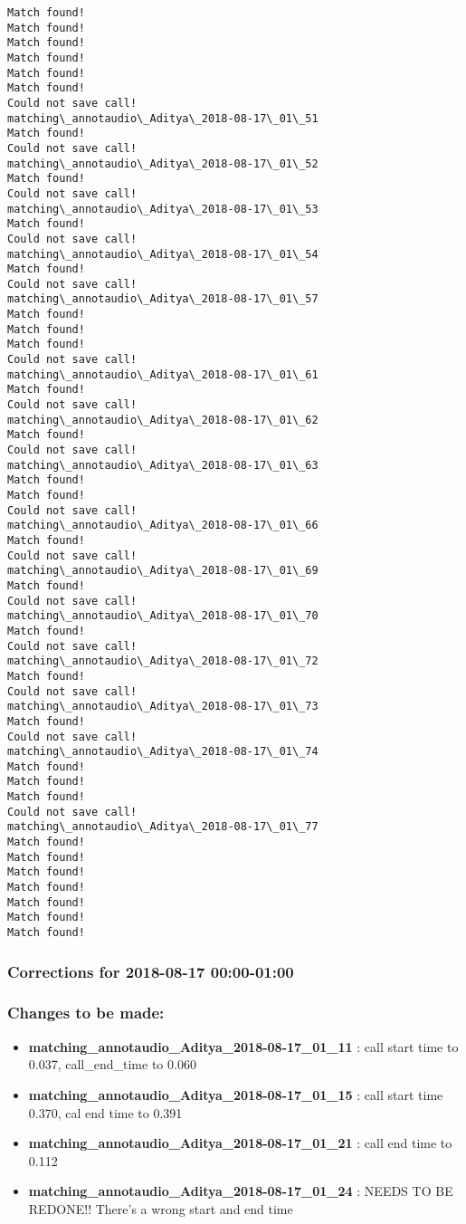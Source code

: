 \documentclass[11pt]{article}
\providecommand{\tightlist}{%
      \setlength{\itemsep}{0pt}\setlength{\parskip}{0pt}}
\begin{document}
\begin{Verbatim}[commandchars=\\\{\}]
Match found!
Match found!
Match found!
Match found!
Match found!
Match found!
Could not save call!
matching\_annotaudio\_Aditya\_2018-08-17\_01\_51
Match found!
Could not save call!
matching\_annotaudio\_Aditya\_2018-08-17\_01\_52
Match found!
Could not save call!
matching\_annotaudio\_Aditya\_2018-08-17\_01\_53
Match found!
Could not save call!
matching\_annotaudio\_Aditya\_2018-08-17\_01\_54
Match found!
Could not save call!
matching\_annotaudio\_Aditya\_2018-08-17\_01\_57
Match found!
Match found!
Match found!
Could not save call!
matching\_annotaudio\_Aditya\_2018-08-17\_01\_61
Match found!
Could not save call!
matching\_annotaudio\_Aditya\_2018-08-17\_01\_62
Match found!
Could not save call!
matching\_annotaudio\_Aditya\_2018-08-17\_01\_63
Match found!
Match found!
Could not save call!
matching\_annotaudio\_Aditya\_2018-08-17\_01\_66
Match found!
Could not save call!
matching\_annotaudio\_Aditya\_2018-08-17\_01\_69
Match found!
Could not save call!
matching\_annotaudio\_Aditya\_2018-08-17\_01\_70
Match found!
Could not save call!
matching\_annotaudio\_Aditya\_2018-08-17\_01\_72
Match found!
Could not save call!
matching\_annotaudio\_Aditya\_2018-08-17\_01\_73
Match found!
Could not save call!
matching\_annotaudio\_Aditya\_2018-08-17\_01\_74
Match found!
Match found!
Match found!
Could not save call!
matching\_annotaudio\_Aditya\_2018-08-17\_01\_77
Match found!
Match found!
Match found!
Match found!
Match found!
Match found!
Match found!

    \end{Verbatim}

    \hypertarget{corrections-for-2018-08-17-0000-0100}{%
\subsubsection{Corrections for 2018-08-17
00:00-01:00}\label{corrections-for-2018-08-17-0000-0100}}

\hypertarget{changes-to-be-made}{%
\subsubsection{Changes to be made:}\label{changes-to-be-made}}

\begin{itemize}
\tightlist
\item
  \textbf{matching\_annotaudio\_Aditya\_2018-08-17\_01\_11} : call start
  time to 0.037, call\_end\_time to 0.060
\item
  \textbf{matching\_annotaudio\_Aditya\_2018-08-17\_01\_15} : call start
  time 0.370, cal end time to 0.391
\item
  \textbf{matching\_annotaudio\_Aditya\_2018-08-17\_01\_21} : call end
  time to 0.112
\item
  \textbf{matching\_annotaudio\_Aditya\_2018-08-17\_01\_24} : NEEDS TO
  BE REDONE!! There's a wrong start and end time
\end{itemize}
\end{document}
